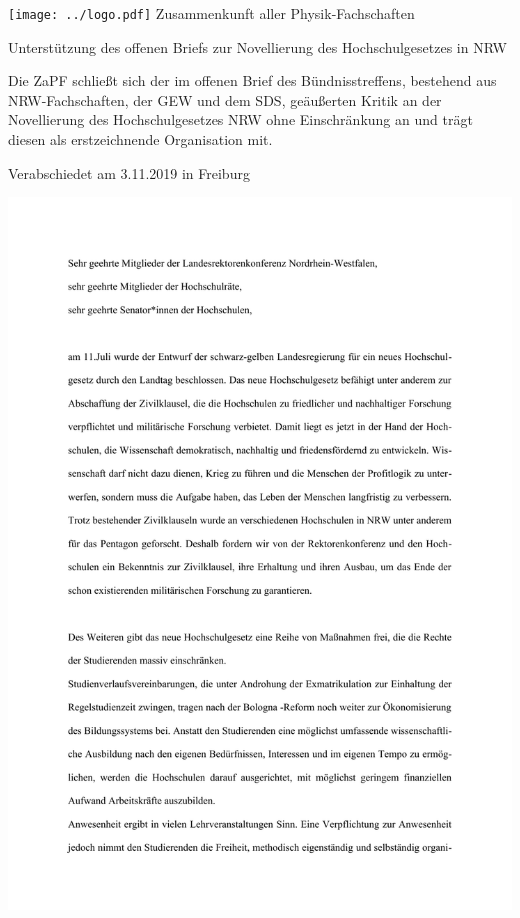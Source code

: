 \documentclass[a4paper]{scrartcl}
\begin{document}
  \hspace{0.87\textwidth}
  \begin{minipage}{120pt}
  	\vspace{-1.8cm}
  	\texttt{[image: ../logo.pdf]}
  	\centering
  	\small Zusammenkunft aller Physik-Fachschaften
  \end{minipage}
  \begin{center}
    \vspace{4cm}
    \huge{Unterstützung des offenen Briefs zur Novellierung des Hochschulgesetzes in NRW}\vspace{.25\baselineskip}\\
  	\normalsize
  \end{center}
  \vspace{2cm}


Die ZaPF schließt sich der im offenen Brief des Bündnisstreffens, bestehend aus
NRW-Fachschaften, der GEW und dem SDS, geäußerten Kritik an der Novellierung
des Hochschulgesetzes NRW ohne Einschränkung an und trägt diesen als
erstzeichnende Organisation mit.

\vfill
\begin{flushright}
	Verabschiedet am 3.11.2019 in Freiburg
\end{flushright}

\newpage

\includegraphics[width=\textwidth]{brief.pdf}
\end{document}
